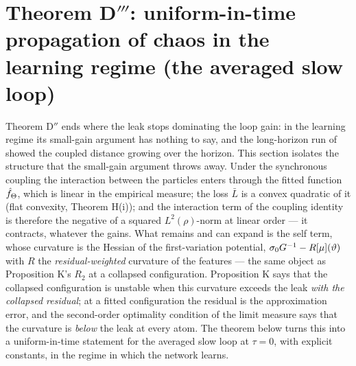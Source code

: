 \section{Theorem D\texorpdfstring{$'''$}{'''}: uniform-in-time propagation of chaos in the learning regime (the
averaged slow loop)}\label{sec:thmDppp}

Theorem D$''$ ends where the leak stops dominating the loop gain: in the learning regime its small-gain argument has
nothing to say, and the long-horizon run of  showed the coupled distance growing over the
horizon. This section isolates the structure that the small-gain argument throws away. Under the synchronous coupling
the interaction between the particles enters through the fitted function $\hat f_\Theta$, which is linear in the
empirical measure; the loss $\bar L$ is a convex quadratic of it (flat convexity, Theorem H(i)); and the interaction
term of the coupling identity is therefore the negative of a squared $L^2(\rho)$-norm at linear order --- it
contracts, whatever the gains. What remains and can expand is the self term, whose curvature is the Hessian of the
first-variation potential, $\sigma_0G^{-1} - R[\mu](\vartheta)$ with $R$ the \emph{residual-weighted} curvature of the
features --- the same object as Proposition K's $R_2$ at a collapsed configuration. Proposition K says that the
collapsed configuration is unstable when this curvature exceeds the leak \emph{with the collapsed residual}; at a
fitted configuration the residual is the approximation error, and the second-order optimality condition of the limit
measure says that the curvature is \emph{below} the leak at every atom. The theorem below turns this into a
uniform-in-time statement for the averaged slow loop at $\tau = 0$, with explicit constants, in the regime in which
the network learns.

